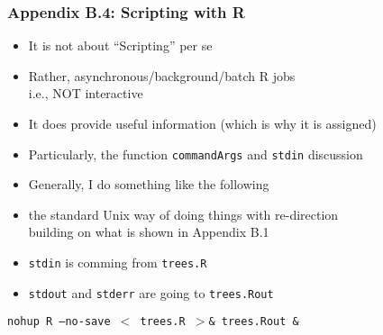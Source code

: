 \documentclass[11pt,pdftex,dvipsnames,usenames,helvetica]{beamer}
\begin{document}
\begin{frame} 
\frametitle{Appendix B.4: Scripting with R}

\begin{itemize}
\item It is not about ``Scripting'' per se
\item Rather, asynchronous/background/batch R jobs\\
 i.e., NOT interactive
\item It does provide useful information (which is why it is assigned)
\item Particularly, the function {\tt commandArgs} and {\tt stdin} discussion
\item Generally, I do something like the following 
\item the standard Unix way of doing things with re-direction\\
building on what is shown in Appendix B.1
\item {\tt stdin} is comming from {\tt trees.R}
\item {\tt stdout} and {\tt stderr} are going to {\tt trees.Rout}
\end{itemize}

{ \tt nohup R --no-save $<$ trees.R $>$\& trees.Rout \&}
\end{frame}
\end{document}
